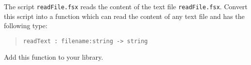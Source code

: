 \label{readFunction}
The script \lstinline[language=console]{readFile.fsx} reads the
content of the text file
\lstinline[language=console]{readFile.fsx}. Convert this script into a
function which can read the content of any text file and has the
following type:
\begin{quote}
  \mbox{\lstinline!readText : filename:string -> string!}
\end{quote}
Add this function to your library.